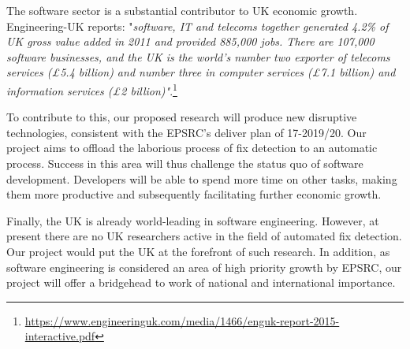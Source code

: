 The software sector is a substantial contributor to UK economic growth. Engineering-UK reports: "\textit{software, IT and telecoms together generated 4.2\% of UK gross value added in 2011 and provided 885,000 jobs. There are 107,000 software businesses, and the UK is the world's number two exporter of telecoms services (£5.4 billion) and number three in computer services (£7.1 billion) and information services (£2 billion)"}.\footnote{\url{https://www.engineeringuk.com/media/1466/enguk-report-2015-interactive.pdf}}

To contribute to this, our proposed research will produce new disruptive technologies, consistent with the EPSRC's deliver plan of 17-2019/20. Our project aims to offload the laborious process of fix detection to an automatic process. Success in this area will thus challenge the status quo of software development. Developers will be able to spend more time on other tasks, making them more productive and subsequently facilitating further economic growth. 

Finally, the UK is already world-leading in software engineering. However, at
present there are no UK researchers active in the field of automated fix detection. Our project would put the UK at the forefront of such research. In addition, as 
software engineering is considered an area of high priority growth by
EPSRC, our project will offer a bridgehead to work of national and international importance.
